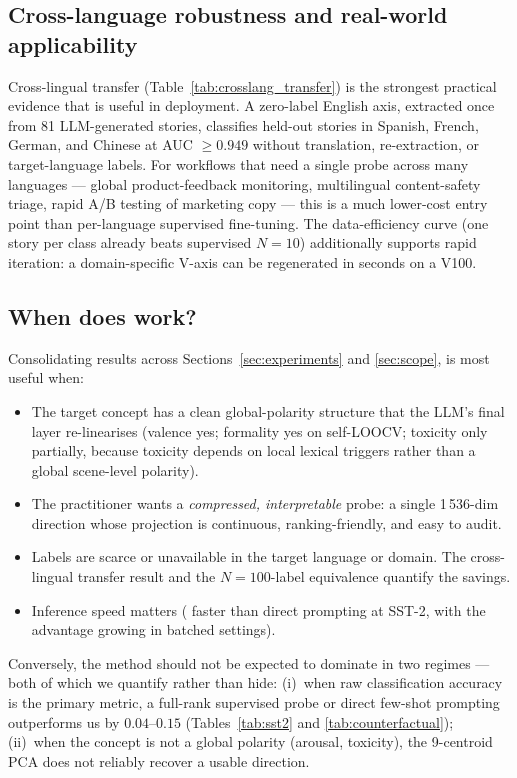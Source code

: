 \subsection{Cross-language robustness and real-world applicability}

Cross-lingual transfer (Table~\ref{tab:crosslang_transfer}) is the
strongest practical evidence that \ours{} is useful in deployment. A
zero-label English axis, extracted once from 81 LLM-generated stories,
classifies held-out stories in Spanish, French, German, and Chinese at
AUC $\geq 0.949$ without translation, re-extraction, or target-language
labels. For workflows that need a single probe across many languages ---
global product-feedback monitoring, multilingual content-safety triage,
rapid A/B testing of marketing copy --- this is a much lower-cost entry
point than per-language supervised fine-tuning. The data-efficiency
curve (one story per class already beats supervised $N=10$) additionally
supports rapid iteration: a domain-specific V-axis can be regenerated in
seconds on a V100.

\subsection{When does \ours{} work?}

Consolidating results across Sections~\ref{sec:experiments} and
\ref{sec:scope}, \ours{} is most useful when:

\begin{itemize}[leftmargin=*]
\item The target concept has a clean global-polarity structure that the
LLM's final layer re-linearises (valence yes; formality yes on
self-LOOCV; toxicity only partially, because toxicity depends on local
lexical triggers rather than a global scene-level polarity).
\item The practitioner wants a \emph{compressed, interpretable} probe:
a single 1\,536-dim direction whose projection is continuous, ranking-friendly,
and easy to audit.
\item Labels are scarce or unavailable in the target language or domain.
The cross-lingual transfer result and the $N\!=\!100$-label equivalence
quantify the savings.
\item Inference speed matters (\speedup{} faster than direct prompting at
SST-2, with the advantage growing in batched settings).
\end{itemize}

Conversely, the method should not be expected to dominate in two
regimes --- both of which we quantify rather than hide:
(i)~when raw classification accuracy is the primary metric, a full-rank
supervised probe or direct few-shot prompting outperforms us by
$0.04$--$0.15$ (Tables~\ref{tab:sst2} and \ref{tab:counterfactual});
(ii)~when the concept is not a global polarity (arousal, toxicity), the
9-centroid PCA does not reliably recover a usable direction.

